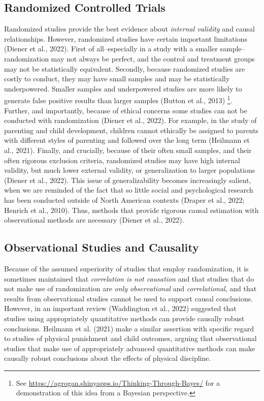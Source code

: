 \documentclass[
  letterpaper,
  DIV=11,
  numbers=noendperiod]{scrreprt}
\begin{document}
\subsection{Randomized Controlled
Trials}\label{randomized-controlled-trials}

Randomized studies provide the best evidence about \emph{internal
validity} and causal relationships. However, randomized studies have
certain important limitations (Diener et al., 2022). First of
all--especially in a study with a smaller sample--randomization may not
always be perfect, and the control and treatment groups may not be
statistically equivalent. Secondly, because randomized studies are
costly to conduct, they may have small samples and may be statistically
underpowered. Smaller samples and underpowered studies are more likely
to generate false positive results than larger samples (Button et al.,
2013) \footnote{See
  \url{https://agrogan.shinyapps.io/Thinking-Through-Bayes/} for a
  demonstration of this idea from a Bayesian perspective.}. Further, and
importantly, because of ethical concerns some studies can not be
conducted with randomization (Diener et al., 2022). For example, in the
study of parenting and child development, children cannot ethically be
assigned to parents with different styles of parenting and followed over
the long term (Heilmann et al., 2021). Finally, and crucially, because
of their often small samples, and their often rigorous exclusion
criteria, randomized studies may have high internal validity, but much
lower external validity, or generalization to larger populations (Diener
et al., 2022). This issue of generalizability becomes increasingly
salient, when we are reminded of the fact that so little social and
psychological research has been conducted outside of North American
contexts (Draper et al., 2022; Henrich et al., 2010). Thus, methods that
provide rigorous causal estimation with observational methods are
necessary (Diener et al., 2022). 

\subsection{Observational Studies and
Causality}\label{observational-studies-and-causality}

Because of the assumed superiority of studies that employ randomization,
it is sometimes maintained that \emph{correlation is not causation} and
that studies that do not make use of randomization are \emph{only
observational} and \emph{correlational}, and that results from
observational studies cannot be used to support causal conclusions.
However, in an important review (Waddington et al., 2022) suggested that
studies using appropriately quantitative methods can provide causally
robust conclusions. Heilmann et al. (2021) make a similar assertion with
specific regard to studies of physical punishment and child outcomes,
arguing that observational studies that make use of appropriately
advanced quantitative methods can make causally robust conclusions about
the effects of physical discipline.
\end{document}
